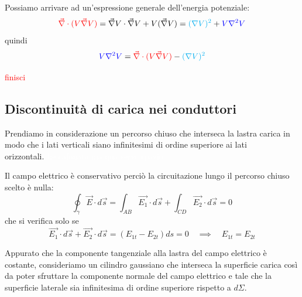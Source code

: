\documentclass[x11names]{report}
\begin{document}
Possiamo arrivare ad un'espressione generale dell'energia potenziale:
\[
\textcolor{red}{\vec{\nabla}\cdot (V\vec{\nabla}V)} = \vec{\nabla}V\cdot \vec{\nabla}V + V(\vec{\nabla}V) = \textcolor{cyan}{(\nabla V)^2} + \textcolor{blue}{V\nabla ^2V}
\]
quindi
\[
\textcolor{blue}{V\nabla ^2V} = \textcolor{red}{\vec{\nabla}\cdot (V\vec{\nabla}V)} - \textcolor{cyan}{(\nabla V)^2}
\]
\begin{center}
	\textcolor{red}{finisci}
\end{center}
\subsection{Discontinuità di carica nei conduttori}
Prendiamo in considerazione un percorso chiuso che interseca la lastra carica in modo che i lati verticali siano infinitesimi di ordine superiore ai lati orizzontali.\textcolor{white}{che cafonata ma qua serve spazio}
\begin{figure}
	\hspace{1cm}
\end{figure}

Il campo elettrico è conservativo perciò la circuitazione lungo il percorso chiuso scelto è nulla:
\[
\oint_\gamma \vec{E}\cdot d\vec{s} = \int_{AB} \vec{E_1}\cdot d\vec{s} + \int_{CD}  \vec{E_2}\cdot  d\vec{s} = 0
\]
che si verifica solo se
\[
\vec{E_1}\cdot  d\vec{s} + \vec{E_2}\cdot  d\vec{s} =( E_{1t}  - E_{2t})ds = 0 \quad \implies \quad  E_{1t} = E_{2t}
\]
\begin{figure}
\end{figure}
Appurato che la componente tangenziale alla lastra del campo elettrico è costante, consideriamo un cilindro gaussiano che interseca la superficie carica così da poter sfruttare la componente normale del campo elettrico e tale che la superficie laterale sia infinitesima di ordine superiore rispetto a \(d\Sigma\). \\
\end{document}

